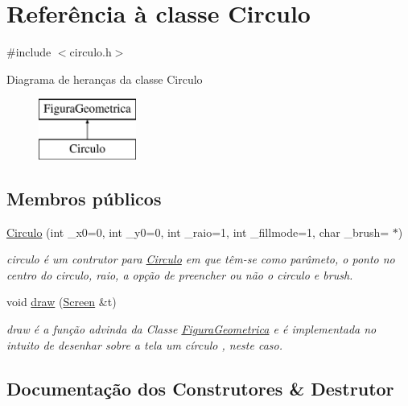 \hypertarget{class_circulo}{}\section{Referência à classe Circulo}
\label{class_circulo}


{\ttfamily \#include $<$circulo.\+h$>$}

Diagrama de heranças da classe Circulo\begin{figure}[H]
\begin{center}
\leavevmode
\includegraphics[height=2.000000cm]{class_circulo}
\end{center}
\end{figure}
\subsection*{Membros públicos}
\begin{DoxyCompactItemize}
\item 
\hyperlink{class_circulo_ad6da9864f1c91e281698e33aa3d18d6a}{Circulo} (int \+\_\+x0=0, int \+\_\+y0=0, int \+\_\+raio=1, int \+\_\+fillmode=1, char \+\_\+brush=\textquotesingle{} $\ast$\textquotesingle{})
\begin{DoxyCompactList}\small\item\em circulo é um contrutor para \hyperlink{class_circulo}{Circulo} em que têm-\/se como parâmeto, o ponto no centro do circulo, raio, a opção de preencher ou não o circulo e brush. \end{DoxyCompactList}\item 
void \hyperlink{class_circulo_a593787d6e0618c2eded23e8839e7bea6}{draw} (\hyperlink{class_screen}{Screen} \&t)
\begin{DoxyCompactList}\small\item\em draw é a função advinda da Classe \hyperlink{class_figura_geometrica}{Figura\+Geometrica} e é implementada no intuito de desenhar sobre a tela um círculo , neste caso. \end{DoxyCompactList}\end{DoxyCompactItemize}


\subsection{Documentação dos Construtores \& Destrutor}
\mbox{\label{class_circulo_ad6da9864f1c91e281698e33aa3d18d6a}} 
